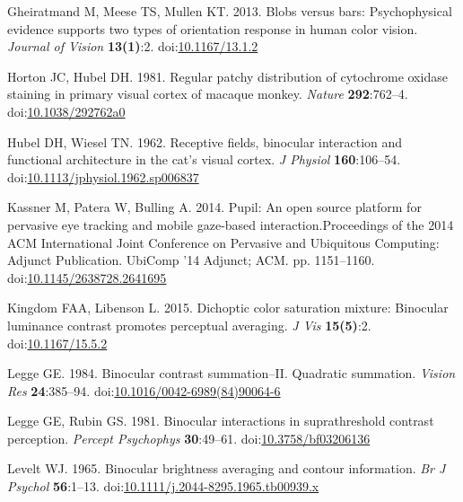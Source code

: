 \documentclass[
]{article}
\newlength{\cslhangindent}
\newlength{\cslentryspacingunit} %
\newenvironment{CSLReferences}[2] %
 {%
  \setlength{\parindent}{0pt}
  \ifodd #1
  \let\oldpar\par
  \def\par{\hangindent=\cslhangindent\oldpar}
  \fi
  \setlength{\parskip}{#2\cslentryspacingunit}
 }%
 {}
\begin{document}
\begin{CSLReferences}{1}{0}
\leavevmode{}%
Gheiratmand M, Meese TS, Mullen KT. 2013. Blobs versus bars: Psychophysical evidence supports two types of orientation response in human color vision. \emph{Journal of Vision} \textbf{13(1)}:2. doi:\href{https://doi.org/10.1167/13.1.2}{10.1167/13.1.2}

\leavevmode{}%
Horton JC, Hubel DH. 1981. Regular patchy distribution of cytochrome oxidase staining in primary visual cortex of macaque monkey. \emph{Nature} \textbf{292}:762--4. doi:\href{https://doi.org/10.1038/292762a0}{10.1038/292762a0}

\leavevmode{}%
Hubel DH, Wiesel TN. 1962. Receptive fields, binocular interaction and functional architecture in the cat's visual cortex. \emph{J Physiol} \textbf{160}:106--54. doi:\href{https://doi.org/10.1113/jphysiol.1962.sp006837}{10.1113/jphysiol.1962.sp006837}

\leavevmode{}%
Kassner M, Patera W, Bulling A. 2014. Pupil: An open source platform for pervasive eye tracking and mobile gaze-based interaction.Proceedings of the 2014 {ACM} International Joint Conference on Pervasive and Ubiquitous Computing: Adjunct Publication. UbiComp '14 Adjunct; {ACM}. pp. 1151--1160. doi:\href{https://doi.org/10.1145/2638728.2641695}{10.1145/2638728.2641695}

\leavevmode{}%
Kingdom FAA, Libenson L. 2015. Dichoptic color saturation mixture: Binocular luminance contrast promotes perceptual averaging. \emph{J Vis} \textbf{15(5)}:2. doi:\href{https://doi.org/10.1167/15.5.2}{10.1167/15.5.2}

\leavevmode{}%
Legge GE. 1984. Binocular contrast summation--II. Quadratic summation. \emph{Vision Res} \textbf{24}:385--94. doi:\href{https://doi.org/10.1016/0042-6989(84)90064-6}{10.1016/0042-6989(84)90064-6}

\leavevmode{}%
Legge GE, Rubin GS. 1981. Binocular interactions in suprathreshold contrast perception. \emph{Percept Psychophys} \textbf{30}:49--61. doi:\href{https://doi.org/10.3758/bf03206136}{10.3758/bf03206136}

\leavevmode{}%
Levelt WJ. 1965. Binocular brightness averaging and contour information. \emph{Br J Psychol} \textbf{56}:1--13. doi:\href{https://doi.org/10.1111/j.2044-8295.1965.tb00939.x}{10.1111/j.2044-8295.1965.tb00939.x}


\end{CSLReferences}
\end{document}
